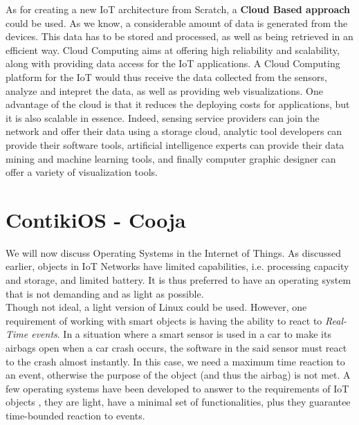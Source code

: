 As for creating a new IoT architecture from Scratch, a \textbf{Cloud Based approach} could be used. As we know, a considerable amount of data is generated from the devices. This data has to be stored and processed, as well as being retrieved in an efficient way. Cloud Computing aims at offering high reliability and scalability, along with providing data access for the IoT applications. A Cloud Computing platform for the IoT would thus receive the data collected from the sensors, analyze and intepret the data, as well as providing web visualizations. One advantage of the cloud is that it reduces the deploying costs for applications, but it is also scalable in essence. Indeed, sensing service providers can join the network and offer their data using a storage cloud, analytic tool developers can provide their software tools, artificial intelligence experts can provide their data mining and machine learning tools, and finally computer graphic designer can offer a variety of visualization tools.




\chapter{ContikiOS - Cooja}
\label{chap:contiki}

We will now discuss Operating Systems in the Internet of Things. As discussed earlier, objects in IoT Networks have limited capabilities, i.e. processing capacity and storage, and limited battery. It is thus preferred to have an operating system that is not demanding and as light as possible. \\

Though not ideal, a light version of Linux could be used. However, one requirement of working with smart objects is having the ability to react to \textit{Real-Time events}. In a situation where a smart sensor is used in a car to make its airbags open when a car crash occurs, the software in the said sensor must react to the crash almost instantly. In this case, we need a maximum time reaction to an event, otherwise the purpose of the object (and thus the airbag) is not met. A few operating systems have been developed to answer to the requirements of IoT objects \cite{website:iot_os}, they are light, have a minimal set of functionalities, plus they guarantee time-bounded reaction to events.\\

